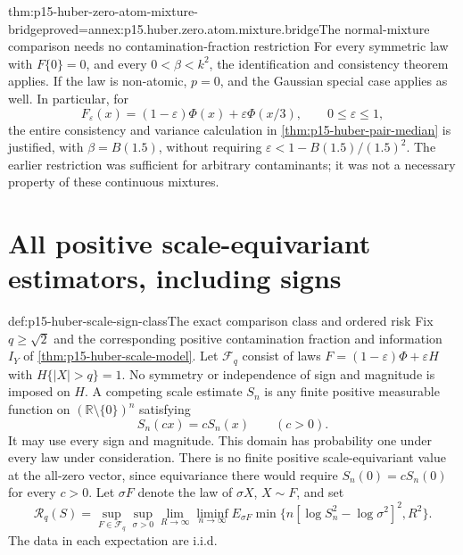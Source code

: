 \begin{hbtheorem}{thm:p15-huber-zero-atom-mixture-bridge}{proved=annex:p15.huber.zero.atom.mixture.bridge}{The normal-mixture comparison needs no contamination-fraction restriction}
For every symmetric law with \(F\{0\}=0\), and every
\(0<\beta<k^2\), the identification and consistency theorem applies.
If the law is non-atomic, \(p=0\), and the Gaussian special case
applies as well. In particular, for
\[
 F_\varepsilon(x)=(1-\varepsilon)\Phi(x)+\varepsilon\Phi(x/3),
                       \qquad 0\leq\varepsilon\leq1,
\]
the entire consistency and variance calculation in
\cref{thm:p15-huber-pair-median} is justified, with
\(\beta=B(1.5)\), without requiring
\(\varepsilon<1-B(1.5)/(1.5)^2\).
The earlier restriction was sufficient for arbitrary contaminants;
it was not a necessary property of these continuous mixtures.
\end{hbtheorem}

\section{All positive scale-equivariant estimators, including signs}
\label{sec:p15-huber-scale-signs}

\begin{hbdefinition}{def:p15-huber-scale-sign-class}{The exact comparison class and ordered risk}
Fix \(q\geq\sqrt2\) and the corresponding positive contamination
fraction and information \(I_Y\) of
\cref{thm:p15-huber-scale-model}.
Let \(\mathcal F_q\) consist of laws
\(F=(1-\varepsilon)\Phi+\varepsilon H\) with
\(H\{|X|>q\}=1\). No symmetry or independence of sign and magnitude
is imposed on \(H\).
A competing scale estimate \(S_n\) is any finite positive measurable
function on \((\mathbb R\setminus\{0\})^n\) satisfying
\[
                         S_n(cx)=cS_n(x)\qquad(c>0).
\]
It may use every sign and magnitude. This domain has probability one
under every law under consideration. There is no finite positive
scale-equivariant value at the all-zero vector, since equivariance
there would require \(S_n(0)=cS_n(0)\) for every \(c>0\).
Let \(\sigma F\) denote the law of \(\sigma X\), \(X\sim F\), and set
\[
 \mathcal R_q(S)=
 \sup_{F\in\mathcal F_q}\sup_{\sigma>0}
 \lim_{R\to\infty}\liminf_{n\to\infty}
 E_{\sigma F}\min\{n[\log S_n^2-\log\sigma^2]^2,R^2\}.
\]
The data in each expectation are i.i.d.
\end{hbdefinition}

